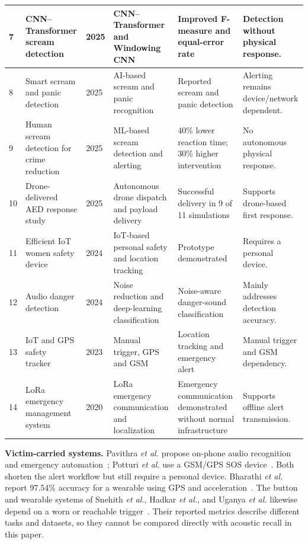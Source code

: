 \documentclass[conference]{IEEEtran}
\begin{document}
\begin{table}[!t]
\begin{tabular}{|
  p{0.7cm}|
  p{3.9cm}|
  p{1.0cm}|
  p{3.6cm}|
  p{3.5cm}|
  p{3.8cm}|}
  7 &
  CNN--Transformer scream detection~\cite{kim2025} &
  2025 &
  CNN--Transformer and Windowing CNN &
  Improved F-measure and equal-error rate &
  Detection without physical response.
  \\ \hline

  8 &
  Smart scream and panic detection~\cite{sharma2025} &
  2025 &
  AI-based scream and panic recognition &
  Reported scream and panic detection &
  Alerting remains device/network dependent.
  \\ \hline

  9 &
  Human scream detection for crime reduction~\cite{srimathi2025} &
  2025 &
  ML-based scream detection and alerting &
  40\% lower reaction time; 30\% higher intervention &
  No autonomous physical response.
  \\ \hline

  10 &
  Drone-delivered AED response study~\cite{smith2025} &
  2025 &
  Autonomous drone dispatch and payload delivery &
  Successful delivery in 9 of 11 simulations &
  Supports drone-based first response.
  \\ \hline

  11 &
  Efficient IoT women safety device~\cite{hadkar2024} &
  2024 &
  IoT-based personal safety and location tracking &
  Prototype demonstrated &
  Requires a personal device.
  \\ \hline

  12 &
  Audio danger detection~\cite{fime2024} &
  2024 &
  Noise reduction and deep-learning classification &
  Noise-aware danger-sound classification &
  Mainly addresses detection accuracy.
  \\ \hline

  13 &
  IoT and GPS safety tracker~\cite{uganya2023} &
  2023 &
  Manual trigger, GPS and GSM &
  Location tracking and emergency alert &
  Manual trigger and GSM dependency.
  \\ \hline

  14 &
  LoRa emergency management system~\cite{sciullo2020} &
  2020 &
  LoRa emergency communication and localization &
  Emergency communication demonstrated without normal infrastructure &
  Supports offline alert transmission.
  \\ \hline

  \end{tabular}
\end{table}
\textbf{Victim-carried systems.} Pavithra \emph{et al.} propose on-phone audio recognition and emergency automation~\cite{pavithra2026}; Potturi \emph{et al.} use a GSM/GPS SOS device~\cite{potturi2026}. Both shorten the alert workflow but still require a personal device. Bharathi \emph{et al.} report 97.54\% accuracy for a wearable using GPS and acceleration~\cite{bharathi2025}. The button and wearable systems of Snehith \emph{et al.}, Hadkar \emph{et al.}, and Uganya \emph{et al.} likewise depend on a worn or reachable trigger~\cite{snehith2025,hadkar2024,uganya2023}. Their reported metrics describe different tasks and datasets, so they cannot be compared directly with acoustic recall in this paper.
\end{document}
